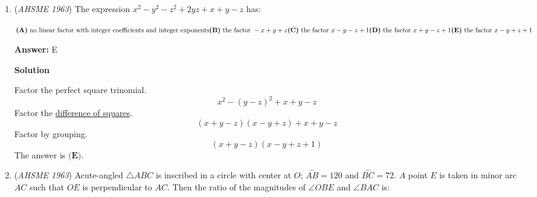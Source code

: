 \begin{enumerate}
 \textbf{Answer: }D



\textbf{Solution}

First, find the number of hours it takes for the two to meet together.  After $h$ hours, the person at $R$ walks $4.5h$ miles.  In the same amount of time, the person at $S$ has been walking at $3.25+0.5(h-1)$ mph for the past hour, so the person walks $\frac{h(6.5+0.5(h-1))}{2}$ miles.

 In order for both to meet, the sum of both of the distances walked must total $76$ miles, so
 \[4.5h + \frac{h(6+0.5h)}{2} = 76\]
 \[4.5h + 3h + 0.25h^2 = 76\]
 \[0.25h^2 + 7.5h - 76 = 0\]
 \[h^2 + 30h - 304 = 0\]
 \[(h + 38)(h - 8) = 0\]Since $h$ must be positive, $h = 8$.  Because it takes $8$ hours to meet, the person from $R$ traveled $36$ miles while the person from $S$ traveled $40$ miles.  Thus, they are $4$ miles closer to $R$ than $S$, so the answer is $\boxed{\textbf{(D)}}$.

 


	\item (\textit{AHSME 1963}) The expression $x^2-y^2-z^2+2yz+x+y-z$ has:


 $\textbf{(A)}\ \text{no linear factor with integer coefficients and integer exponents} \qquad \\ \textbf{(B)}\ \text{the factor }-x+y+z \qquad \\ \textbf{(C)}\ \text{the factor }x-y-z+1 \qquad \\ \textbf{(D)}\ \text{the factor }x+y-z+1 \qquad \\ \textbf{(E)}\ \text{the factor }x-y+z+1$

 \textbf{Answer: }E



\textbf{Solution}

Factor the perfect square trinomial.
 \[x^2 - (y-z)^2 + x + y - z\]Factor the \href{https://artofproblemsolving.com/wiki/index.php?title=Difference\_of\_squares}{difference of squares}.
 \[(x+y-z)(x-y+z) + x + y - z\]Factor by grouping.
 \[(x+y-z)(x-y+z+1)\]The answer is $\boxed{\textbf{(E)}}$.

 


	\item (\textit{AHSME 1963}) Acute-angled $\triangle ABC$ is inscribed in a circle with center at $O$; $\stackrel \frown {AB} = 120$ and $\stackrel \frown {BC} = 72$. 
$A$ point $E$ is taken in minor arc $AC$ such that $OE$ is perpendicular to $AC$. Then the ratio of the magnitudes of $\angle OBE$ and $\angle BAC$ is:



\end{enumerate}
